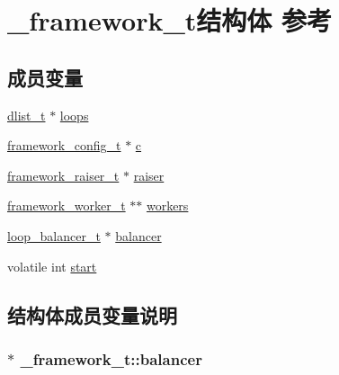 \hypertarget{a00013}{}\section{\+\_\+framework\+\_\+t结构体 参考}
\label{a00013}
\subsection*{成员变量}
\begin{DoxyCompactItemize}
\item 
\hyperlink{a00051_ad6644d67df4b4e3596c1eb12977d1d16_ad6644d67df4b4e3596c1eb12977d1d16}{dlist\+\_\+t} $\ast$ \hyperlink{a00013_acf1bfd1ee224a686a3af7d5ff7629248_acf1bfd1ee224a686a3af7d5ff7629248}{loops}
\item 
\hyperlink{a00051_a55b26efa9e6ee05514d087ba2593a54b_a55b26efa9e6ee05514d087ba2593a54b}{framework\+\_\+config\+\_\+t} $\ast$ \hyperlink{a00013_afe5323ec18afb54a631f5069fd2b904b_afe5323ec18afb54a631f5069fd2b904b}{c}
\item 
\hyperlink{a00051_aa3ac31db191829c9e6db624d660a2563_aa3ac31db191829c9e6db624d660a2563}{framework\+\_\+raiser\+\_\+t} $\ast$ \hyperlink{a00013_a07ba836ce414dded15aa2ebd1c5f0631_a07ba836ce414dded15aa2ebd1c5f0631}{raiser}
\item 
\hyperlink{a00051_aeb7a44e6b579659a8aae81f3ab819af3_aeb7a44e6b579659a8aae81f3ab819af3}{framework\+\_\+worker\+\_\+t} $\ast$$\ast$ \hyperlink{a00013_ae67335a4a11e73fa2c1bfdb0965c60c6_ae67335a4a11e73fa2c1bfdb0965c60c6}{workers}
\item 
\hyperlink{a00051_a649c7e850ab247b5f70ad27e335a129d_a649c7e850ab247b5f70ad27e335a129d}{loop\+\_\+balancer\+\_\+t} $\ast$ \hyperlink{a00013_a5ec36af472f9290ee5bdb4a7805b0ed3_a5ec36af472f9290ee5bdb4a7805b0ed3}{balancer}
\item 
volatile int \hyperlink{a00013_af918940379456ef4ae9e0aaf6a38acbf_af918940379456ef4ae9e0aaf6a38acbf}{start}
\end{DoxyCompactItemize}


\subsection{结构体成员变量说明}
\hypertarget{a00013_a5ec36af472f9290ee5bdb4a7805b0ed3_a5ec36af472f9290ee5bdb4a7805b0ed3}{}
\subsubsection[{balancer}]{$\ast$ \+\_\+framework\+\_\+t\+::balancer}\label{a00013_a5ec36af472f9290ee5bdb4a7805b0ed3_a5ec36af472f9290ee5bdb4a7805b0ed3}
\hypertarget{a00013_afe5323ec18afb54a631f5069fd2b904b_afe5323ec18afb54a631f5069fd2b904b}{}

